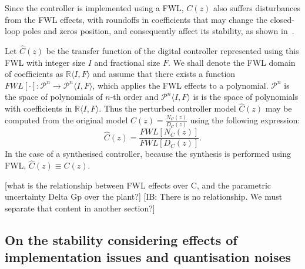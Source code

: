 \documentclass{sig-alternate-05-2015}
\newcommand{\blue}[1]{{\color{blue}#1}}
\newcommand{\red}[1]{{\color{red}#1}}
\begin{document}
Since the controller is implemented using a FWL, $C(z)$ also suffers disturbances from the FWL effects, with roundoffs in coefficients that may change the closed-loop poles and zeros position, and consequently affect its stability, as shown in~\cite{Bessa16}.


Let $\hat{C}(z)$ be the transfer function of the digital controller represented using this FWL with integer size $I$ and fractional
size $F$.  We shall denote the FWL domain of coefficients as $\mathbb{R}\langle I,F \rangle$
and assume that there exists a function $FWL[\cdot]:\mathcal{P}^{n}\rightarrow \mathcal{P}^{n}\langle I,F \rangle$, which applies the FWL effects to a polynomial. $\mathcal{P}^{n}$ is the space of polynomials of $n$-th order and $\mathcal{P}^{n}\langle I,F \rangle$ is is the space of polynomials with coefficients in $\mathbb{R}\langle I,F \rangle$.
Thus the perturbed controller model $\hat{C}(z)$ may be computed from the original model $C(z)=\frac{N_{C}(z)}{D_{C}(z)}$ using the following expression:
\begin{equation}
\hat{C}(z)=\frac{FWL[N_{C}(z)]}{FWL[D_{C}(z)]}.
\end{equation}
In the case of a synthesised controller, because the synthesis is performed using FWL, $\hat{C}(z) \equiv C(z)$. 

\red{[what is the relationship between FWL effects over C, and the parametric uncertainty Delta Gp over the plant?]} 
\blue{[IB: There is no relationship. We must separate that content in another section?]}

%

\subsection{On the stability considering effects of implementation issues and quantisation noises}
\label{sec:stability}
\end{document}
